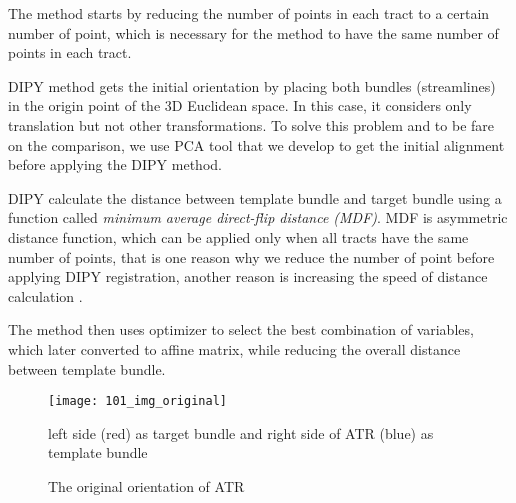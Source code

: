 \documentclass[../structure.tex]{subfiles}
\begin{document}
The method starts by reducing the number of points in each tract to a certain number of point, which is necessary for the method to have the same number of points in each tract.

DIPY method gets the initial orientation by placing both bundles (streamlines) in the origin point of the 3D Euclidean space. In this case, it considers only translation but not other transformations. To solve this problem and to be fare on the comparison, we use PCA tool that we develop to get the initial alignment before applying the DIPY method.

DIPY calculate the distance between template bundle and target bundle using a function called \textit{minimum average direct-flip distance (MDF)}. MDF is asymmetric
distance function, which can be applied only when all tracts have the same number of points, that is one reason why we reduce the number of point before applying DIPY registration, another reason is increasing the speed of distance calculation \cite{Garyfallidis2012}.

The method then uses optimizer to select the best combination of variables, which later converted to affine matrix, while reducing the overall distance between template bundle.

\begin{comment}
\section{Testing steps}
\begin{itemize}
\item Read bundles from \textit{ply} files
\item Apply PCA and visually inspect the alignment result
\item If the visual inspection was positive and PCA improved the alignment, we consider its result, otherwise we just flip the template bundle or consider the original orientation
\item Generate distances histogram between two bundles to select the distance threshold
\item Start the registration and iterate until there is no more improvement on the alignment
\end{itemize}
\end{comment}

\begin{figure}[H]
\centering
\texttt{[image: 101\_img\_original]}
\captionsetup{justification=centering}
\caption{The original orientation of ATR}%
{ left side (red) as target bundle and right side of ATR (blue) as template bundle}
\label{fig:img_original}
\end{figure}
\end{document}
